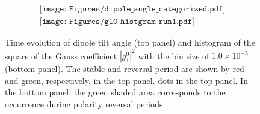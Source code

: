 \begin{figure}[ht]
\begin{center}
\[
\begin{array}{c}
\texttt{[image: Figures/dipole\_angle\_categorized.pdf]} \\
\texttt{[image: Figures/g10\_histgram\_run1.pdf]}
\end{array}
\]
\end{center}
\caption{
Time evolution of dipole tilt angle (top panel) and histogram of the square of the Gauss coefficient $|g_{1}^{0}|^2$ with the bin size of $1.0 \times 10^{-5}$ (bottom panel).
The stable and reversal period are shown by red and green, respectively, in the top panel.  dots in the top panel. 
In the bottom panel, the green shaded area corresponds to the occurrence during polarity reversal periods.
}
\label{Fig:Reversal_period_def}
\end{figure}